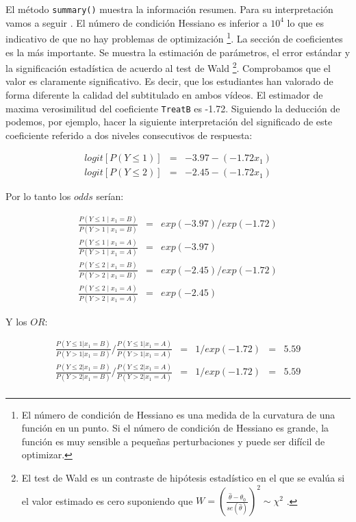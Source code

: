 \documentclass[
  12pt,
  a4paper,
  extrafontsizes,
  onecolumn,
  openright]{memoir}
\begin{document}
\normalsize

El método \texttt{summary()} muestra la información resumen. Para su
interpretación vamos a seguir \textcite{christensen2018CumulativeLM}. El
número de condición Hessiano es inferior a \(10^4\) lo que es indicativo
de que no hay problemas de optimización \footnote{El número de condición
  de Hessiano es una medida de la curvatura de una función en un punto.
  Si el número de condición de Hessiano es grande, la función es muy
  sensible a pequeñas perturbaciones y puede ser difícil de optimizar.}.
La sección de coeficientes es la más importante. Se muestra la
estimación de parámetros, el error estándar y la significación
estadística de acuerdo al test de Wald \footnote{El test de Wald es un
  contraste de hipótesis estadístico en el que se evalúa si el valor
  estimado es cero suponiendo que
  \(W = \left(\frac{\hat{\theta} - \theta_0}{se(\hat{\theta})}\right)^2 \sim \chi^{2}\)
  .}. Comprobamos que el valor es claramente significativo. Es decir,
que los estudiantes han valorado de forma diferente la calidad del
subtitulado en ambos vídeos. El estimador de maxima verosimilitud del
coeficiente \texttt{TreatB} es -1.72. Siguiendo la deducción de
\textcite{bruin2011} podemos, por ejemplo, hacer la siguiente
interpretación del significado de este coeficiente referido a dos
niveles consecutivos de respuesta:

\[
\begin{aligned}
logit [P(Y \le 1)] & = & -3.97 - (-1.72 x_1) \\
logit [P(Y \le 2)] & = & -2.45 - (-1.72 x_1)
\end{aligned}
\]

Por lo tanto los \(odds\) serían:

\[
\begin{aligned}
\frac{P(Y \le 1 \mid x_1 = B)}{P(Y > 1 \mid x_1 = B)} & = & exp(-3.97)/exp(-1.72) \\
\frac{P(Y \le 1 \mid x_1 = A)}{P(Y > 1 \mid x_1 = A)} & = & exp(-3.97) \\
\frac{P(Y \le 2 \mid x_1 = B)}{P(Y > 2 \mid x_1 = B)} & = & exp(-2.45)/exp(-1.72) \\
\frac{P(Y \le 2 \mid x_1 = A)}{P(Y > 2 \mid x_1 = A)} & = & exp(-2.45)
\end{aligned}
\]

Y los \(OR\):

\[
\begin{aligned}
\frac{P(Y \le 1 | x_1=B)}{P(Y > 1 | x_1=B)} / \frac{P(Y \le 1 | x_1=A)}{P(Y > 1 | x_1=A)} & = & 1/exp(-1.72) & = & 5.59 \\
\frac{P(Y \le 2 | x_1=B)}{P(Y > 2 | x_1=B)} / \frac{P(Y \le 2 | x_1=A)}{P(Y > 2 | x_1=A)} & = & 1/exp(-1.72) & = & 5.59 \\
\end{aligned}
\]
\end{document}
